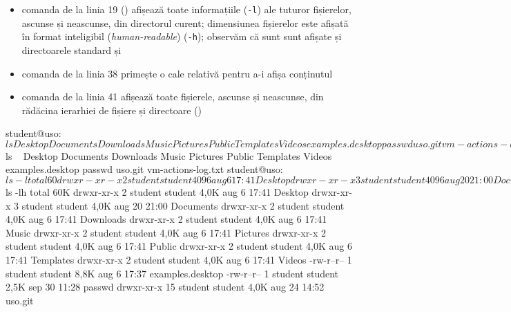 \begin{itemize}
  \item comanda de la linia 19 () afișează toate informațiile (\texttt{-l}) ale tuturor fișierelor, ascunse și neascunse, din directorul curent;
    dimensiunea fișierelor este afișată în format inteligibil (\textit{human-readable}) (\texttt{-h});
    observăm că sunt sunt afișate și directoarele standard  și 
  \item comanda de la linia 38 primește o cale relativă pentru a-i afișa conținutul
  \item comanda de la linia 41 afișează toate fișierele, ascunse și neascunse, din rădăcina ierarhiei de fișiere și directoare (\file{/})
\end{itemize}

\begin{screen}[caption={Folosirea comenzii ls},label={lst:fs:ls}]
student@uso:~$ ls
Desktop  Documents  Downloads  Music  Pictures  Public  Templates  Videos  examples.desktop  passwd  uso.git  vm-actions-log.txt
student@uso:~$ ls ~
Desktop  Documents  Downloads  Music  Pictures  Public  Templates  Videos  examples.desktop  passwd  uso.git  vm-actions-log.txt
student@uso:~$ ls -l
total 60
drwxr-xr-x  2 student student 4096 aug  6 17:41 Desktop
drwxr-xr-x  3 student student 4096 aug 20 21:00 Documents
drwxr-xr-x  2 student student 4096 aug  6 17:41 Downloads
drwxr-xr-x  2 student student 4096 aug  6 17:41 Music
drwxr-xr-x  2 student student 4096 aug  6 17:41 Pictures
drwxr-xr-x  2 student student 4096 aug  6 17:41 Public
drwxr-xr-x  2 student student 4096 aug  6 17:41 Templates
drwxr-xr-x  2 student student 4096 aug  6 17:41 Videos
-rw-r--r--  1 student student 8980 aug  6 17:37 examples.desktop
-rw-r--r--  1 student student 2506 sep 30 11:28 passwd
drwxr-xr-x 15 student student 4096 aug 24 14:52 uso.git
-rw-r--r--  1 student student 4827 aug 21 14:37 vm-actions-log.txt
student@uso:~$ ls -lh
total 60K
drwxr-xr-x  2 student student 4,0K aug  6 17:41 Desktop
drwxr-xr-x  3 student student 4,0K aug 20 21:00 Documents
drwxr-xr-x  2 student student 4,0K aug  6 17:41 Downloads
drwxr-xr-x  2 student student 4,0K aug  6 17:41 Music
drwxr-xr-x  2 student student 4,0K aug  6 17:41 Pictures
drwxr-xr-x  2 student student 4,0K aug  6 17:41 Public
drwxr-xr-x  2 student student 4,0K aug  6 17:41 Templates
drwxr-xr-x  2 student student 4,0K aug  6 17:41 Videos
-rw-r--r--  1 student student 8,8K aug  6 17:37 examples.desktop
-rw-r--r--  1 student student 2,5K sep 30 11:28 passwd
drwxr-xr-x 15 student student 4,0K aug 24 14:52 uso.git

\end{screen}
